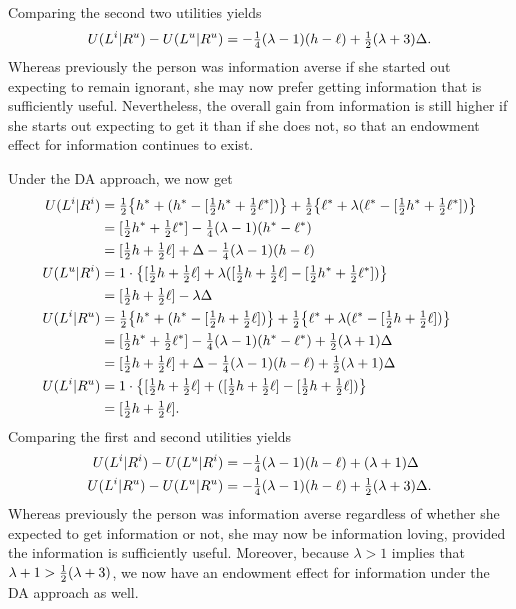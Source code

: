 Comparing the second two utilities yields
\begin{equation*}
  U(L^i|R^u) - U(L^u|R^u) = - \tfrac{1}{4} (\lambda-1)(h-\ell) + \tfrac{1}{2} (\lambda + 3) \Delta.
\end{equation*}
Whereas previously the person was information averse if she started out expecting to remain ignorant, she may now prefer getting information that is sufficiently useful. Nevertheless, the overall gain from information is still higher if she starts out expecting to get it than if she does not, so that an endowment effect for information continues to exist.

Under the DA approach, we now get
\begin{align*}
  U(L^i|R^i)
    &= \tfrac{1}{2} \bigl\{h^* + (h^* - [\tfrac{1}{2} h^* + \tfrac{1}{2} \ell^*])\bigr\} +
       \tfrac{1}{2} \bigl\{\ell^* + \lambda(\ell^* - [\tfrac{1}{2} h^* + \tfrac{1}{2} \ell^*]) \bigr\}
    \\
    &= [\tfrac{1}{2} h^* + \tfrac{1}{2} \ell^*] - \tfrac{1}{4} (\lambda - 1)(h^*-\ell^*)
    \\
    &= [\tfrac{1}{2} h + \tfrac{1}{2} \ell] + \Delta - \tfrac{1}{4} (\lambda-1)(h-\ell)
    \\
  U(L^u|R^i)
    &= 1\cdot \bigl\{ [\tfrac{1}{2} h + \tfrac{1}{2} \ell] + \lambda([\tfrac{1}{2} h + \tfrac{1}{2} \ell] - [\tfrac{1}{2} h^* + \tfrac{1}{2} \ell^*]) \bigr\}
    \\
    &= [\tfrac{1}{2} h + \tfrac{1}{2} \ell] - \lambda \Delta
    \\
  U(L^i|R^u)
    &= \tfrac{1}{2} \bigl\{h^* + (h^* - [\tfrac{1}{2} h + \tfrac{1}{2} \ell])\bigr\} +
       \tfrac{1}{2} \bigl\{\ell^* + \lambda(\ell^* - [\tfrac{1}{2} h + \tfrac{1}{2} \ell]) \bigr\}
    \\
    &= [\tfrac{1}{2} h^* + \tfrac{1}{2} \ell^*] - \tfrac{1}{4} (\lambda - 1)(h^* - \ell^*) +
       \tfrac{1}{2} (\lambda + 1)\Delta
    \\
    &= [\tfrac{1}{2} h + \tfrac{1}{2} \ell] + \Delta - \tfrac{1}{4} (\lambda-1)(h-\ell) +
       \tfrac{1}{2} (\lambda + 1)\Delta
    \\
  U(L^i|R^u)
    &= 1\cdot \bigl\{ [\tfrac{1}{2} h + \tfrac{1}{2} \ell] + ([\tfrac{1}{2} h + \tfrac{1}{2} \ell]-[\tfrac{1}{2} h + \tfrac{1}{2} \ell]) \bigr\}
    \\
    &= [\tfrac{1}{2} h + \tfrac{1}{2} \ell].
\end{align*}
Comparing the first and second utilities yields
\begin{align*}
  U(L^i|R^i) - U(L^u|R^i)
    &= -\tfrac{1}{4} (\lambda-1)(h-\ell) + (\lambda + 1) \Delta
    \\
  U(L^i|R^u) - U(L^u|R^u)
    &= -\tfrac{1}{4} (\lambda-1)(h-\ell) + \tfrac{1}{2} (\lambda + 3) \Delta.
\end{align*}
Whereas previously the person was information averse regardless of whether she expected to get information or not, she may now be information loving, provided the information is sufficiently useful. Moreover, because $\lambda>1$ implies that $\lambda + 1 > \tfrac{1}{2} (\lambda+3)$, we now have an endowment effect for information under the DA approach as well.

